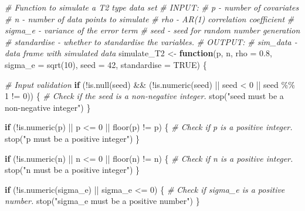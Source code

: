 \documentclass[
  11pt,
]{article}
\newenvironment{Shaded}{}{}
\newcommand{\AttributeTok}[1]{\textcolor[rgb]{0.49,0.56,0.16}{#1}}
\newcommand{\CommentTok}[1]{\textcolor[rgb]{0.38,0.63,0.69}{\textit{#1}}}
\newcommand{\ConstantTok}[1]{\textcolor[rgb]{0.53,0.00,0.00}{#1}}
\newcommand{\ControlFlowTok}[1]{\textcolor[rgb]{0.00,0.44,0.13}{\textbf{#1}}}
\newcommand{\DecValTok}[1]{\textcolor[rgb]{0.25,0.63,0.44}{#1}}
\newcommand{\FloatTok}[1]{\textcolor[rgb]{0.25,0.63,0.44}{#1}}
\newcommand{\FunctionTok}[1]{\textcolor[rgb]{0.02,0.16,0.49}{#1}}
\newcommand{\NormalTok}[1]{#1}
\newcommand{\OtherTok}[1]{\textcolor[rgb]{0.00,0.44,0.13}{#1}}
\newcommand{\SpecialCharTok}[1]{\textcolor[rgb]{0.25,0.44,0.63}{#1}}
\newcommand{\StringTok}[1]{\textcolor[rgb]{0.25,0.44,0.63}{#1}}
\begin{document}
\begin{Shaded}
\begin{Highlighting}[]
\CommentTok{\# Function to simulate a T2 type data set}
\CommentTok{\# INPUT: }
\CommentTok{\#       p {-} number of covariates}
\CommentTok{\#       n {-} number of data points to simulate}
\CommentTok{\#       rho {-} AR(1) correlation coefficient}
\CommentTok{\#       sigma\_e {-} variance of the error term}
\CommentTok{\#       seed {-} seed for random number generation}
\CommentTok{\#       standardise {-} whether to standardise the variables.}
\CommentTok{\# OUTPUT:}
\CommentTok{\#       sim\_data {-} data frame with simulated data}
\NormalTok{simulate\_T2 }\OtherTok{\textless{}{-}} \ControlFlowTok{function}\NormalTok{(p, n, }\AttributeTok{rho =} \FloatTok{0.8}\NormalTok{, }\AttributeTok{sigma\_e =} \FunctionTok{sqrt}\NormalTok{(}\DecValTok{10}\NormalTok{), }
                        \AttributeTok{seed =} \DecValTok{42}\NormalTok{, }\AttributeTok{standardise =} \ConstantTok{TRUE}\NormalTok{) \{}
  
  \CommentTok{\# Input validation}
  \ControlFlowTok{if}\NormalTok{ (}\SpecialCharTok{!}\FunctionTok{is.null}\NormalTok{(seed) }\SpecialCharTok{\&\&}\NormalTok{ (}\SpecialCharTok{!}\FunctionTok{is.numeric}\NormalTok{(seed) }\SpecialCharTok{||}\NormalTok{ seed }\SpecialCharTok{\textless{}} \DecValTok{0} \SpecialCharTok{||}\NormalTok{ seed }\SpecialCharTok{\%\%} \DecValTok{1} \SpecialCharTok{!=} \DecValTok{0}\NormalTok{)) \{}
    \CommentTok{\# Check if the seed is a non{-}negative integer.}
    \FunctionTok{stop}\NormalTok{(}\StringTok{"seed must be a non{-}negative integer"}\NormalTok{)}
\NormalTok{  \}}
  
  \ControlFlowTok{if}\NormalTok{ (}\SpecialCharTok{!}\FunctionTok{is.numeric}\NormalTok{(p) }\SpecialCharTok{||}\NormalTok{ p }\SpecialCharTok{\textless{}=} \DecValTok{0} \SpecialCharTok{||} \FunctionTok{floor}\NormalTok{(p) }\SpecialCharTok{!=}\NormalTok{ p) \{}
    \CommentTok{\# Check if p is a positive integer.}
    \FunctionTok{stop}\NormalTok{(}\StringTok{"p must be a positive integer"}\NormalTok{)}
\NormalTok{  \}}
  
  \ControlFlowTok{if}\NormalTok{ (}\SpecialCharTok{!}\FunctionTok{is.numeric}\NormalTok{(n) }\SpecialCharTok{||}\NormalTok{ n }\SpecialCharTok{\textless{}=} \DecValTok{0} \SpecialCharTok{||} \FunctionTok{floor}\NormalTok{(n) }\SpecialCharTok{!=}\NormalTok{ n) \{}
    \CommentTok{\# Check if n is a positive integer.}
    \FunctionTok{stop}\NormalTok{(}\StringTok{"n must be a positive integer"}\NormalTok{)}
\NormalTok{  \}}
  
  \ControlFlowTok{if}\NormalTok{ (}\SpecialCharTok{!}\FunctionTok{is.numeric}\NormalTok{(sigma\_e) }\SpecialCharTok{||}\NormalTok{ sigma\_e }\SpecialCharTok{\textless{}=} \DecValTok{0}\NormalTok{) \{}
    \CommentTok{\# Check if sigma\_e is a positive number.}
    \FunctionTok{stop}\NormalTok{(}\StringTok{"sigma\_e must be a positive number"}\NormalTok{)}
\NormalTok{  \}}
  

\end{Highlighting}
\end{Shaded}
\end{document}
